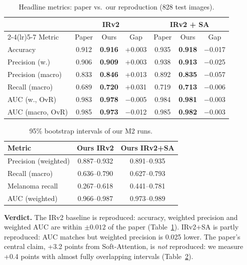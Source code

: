 \documentclass[conference]{IEEEtran}
\begin{document}
\begin{table}[t]
\caption{Headline metrics: paper vs.\ our reproduction (828 test images).}
\label{tab:headline}
\centering
\footnotesize
\setlength{\tabcolsep}{3.5pt}
\begin{tabular}{lcccccc}
\toprule
& \multicolumn{3}{c}{IRv2} & \multicolumn{3}{c}{IRv2 + SA}\\
\cmidrule(lr){2-4}\cmidrule(lr){5-7}
Metric & Paper & Ours & Gap & Paper & Ours & Gap\\
\midrule
Accuracy & 0.912 & \textbf{0.916} & +0.003 & 0.935 & \textbf{0.918} & $-$0.017\\
Precision (w.) & 0.906 & \textbf{0.909} & +0.003 & 0.938 & \textbf{0.913} & $-$0.025\\
Precision (macro) & 0.833 & \textbf{0.846} & +0.013 & 0.892 & \textbf{0.835} & $-$0.057\\
Recall (macro) & 0.689 & \textbf{0.720} & +0.031 & 0.719 & \textbf{0.713} & $-$0.006\\
AUC (w., OvR) & 0.983 & \textbf{0.978} & $-$0.005 & 0.984 & \textbf{0.981} & $-$0.003\\
AUC (macro, OvR) & 0.985 & \textbf{0.973} & $-$0.012 & 0.985 & \textbf{0.982} & $-$0.003\\
\bottomrule
\end{tabular}
\end{table}

\begin{table}[t]
\caption{95\% bootstrap intervals of our M2 runs.}
\label{tab:boot}
\centering
\footnotesize
\begin{tabular}{lcc}
\toprule
Metric & Ours IRv2 & Ours IRv2+SA\\
\midrule
Precision (weighted) & 0.887--0.932 & 0.891--0.935\\
Recall (macro) & 0.636--0.790 & 0.627--0.793\\
Melanoma recall & 0.267--0.618 & 0.441--0.781\\
AUC (weighted) & 0.966--0.987 & 0.973--0.989\\
\bottomrule
\end{tabular}
\end{table}

\textbf{Verdict.} The IRv2 baseline is reproduced: accuracy, weighted precision and weighted AUC are within $\pm0.012$ of the paper (Table~\ref{tab:headline}). IRv2+SA is partly reproduced: AUC matches but weighted precision is 0.025 lower. The paper's central claim, +3.2 points from Soft-Attention, is \emph{not} reproduced: we measure +0.4 points with almost fully overlapping intervals (Table~\ref{tab:boot}).
\end{document}
